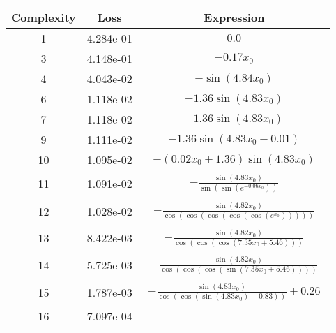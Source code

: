 \begin{center}
        \begin{tabular}{|c|c|c|}
        \hline
        Complexity & Loss & Expression \\
        \hline
        1 & 4.284e-01 & $\begin{aligned}0.0\end{aligned}$\\ \hline3 & 4.148e-01 & $\begin{aligned}- 0.17 x_{0}\end{aligned}$\\ \hline4 & 4.043e-02 & $\begin{aligned}- \sin{\left(4.84 x_{0} \right)}\end{aligned}$\\ \hline6 & 1.118e-02 & $\begin{aligned}- 1.36 \sin{\left(4.83 x_{0} \right)}\end{aligned}$\\ \hline7 & 1.118e-02 & $\begin{aligned}- 1.36 \sin{\left(4.83 x_{0} \right)}\end{aligned}$\\ \hline9 & 1.111e-02 & $\begin{aligned}- 1.36 \sin{\left(4.83 x_{0} - 0.01 \right)}\end{aligned}$\\ \hline10 & 1.095e-02 & $\begin{aligned}- \left(0.02 x_{0} + 1.36\right) \sin{\left(4.83 x_{0} \right)}\end{aligned}$\\ \hline11 & 1.091e-02 & $\begin{aligned}- \frac{\sin{\left(4.83 x_{0} \right)}}{\sin{\left(\sin{\left(e^{- 0.06 x_{0}} \right)} \right)}}\end{aligned}$\\ \hline12 & 1.028e-02 & $\begin{aligned}- \frac{\sin{\left(4.82 x_{0} \right)}}{\cos{\left(\cos{\left(\cos{\left(\cos{\left(\cos{\left(e^{x_{0}} \right)} \right)} \right)} \right)} \right)}}\end{aligned}$\\ \hline13 & 8.422e-03 & $\begin{aligned}- \frac{\sin{\left(4.82 x_{0} \right)}}{\cos{\left(\cos{\left(\cos{\left(7.35 x_{0} + 5.46 \right)} \right)} \right)}}\end{aligned}$\\ \hline14 & 5.725e-03 & $\begin{aligned}- \frac{\sin{\left(4.82 x_{0} \right)}}{\cos{\left(\cos{\left(\cos{\left(\sin{\left(7.35 x_{0} + 5.46 \right)} \right)} \right)} \right)}}\end{aligned}$\\ \hline15 & 1.787e-03 & $\begin{aligned}- \frac{\sin{\left(4.83 x_{0} \right)}}{\cos{\left(\cos{\left(\sin{\left(4.83 x_{0} \right)} - 0.83 \right)} \right)}} + 0.26\end{aligned}$\\ \hline16 & 7.097e-04 & 
\end{tabular}
\end{center}
